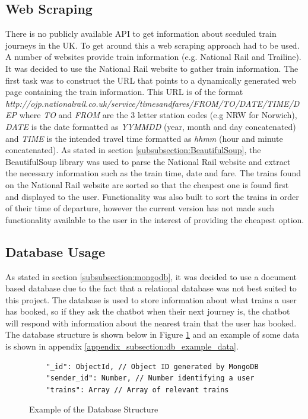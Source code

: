 \documentclass[12pt,a4paper]{article}
\begin{document}
    \subsection{Web Scraping}
    There is no publicly available API to get information about sceduled train journeys in the UK. To get around this a web scraping approach had to be used. A number of websites provide train information (e.g. National Rail and Trailine). It was decided to use the National Rail website to gather train information. The first task was to construct the URL that points to a dynamically generated web page containing the train information. This URL is of the format
    \emph{http://ojp.nationalrail.co.uk/service/timesandfares/FROM/TO/DATE/TIME/DEP} where \emph{TO} and \emph{FROM} are the 3 letter station codes (e.g NRW for Norwich), \emph{DATE} is the date formatted as \emph{YYMMDD} (year, month and day concatenated) and \emph{TIME} is the intended travel time formatted as \emph{hhmm} (hour and minute concatenated).
    As stated in section \ref{subsubsection:BeautifulSoup}, the BeautifulSoup library was used to parse the National Rail website and extract the necessary information such as the train time, date and fare. The trains found on the National Rail website are sorted so that the cheapest one is found first and displayed to the user. Functionality was also built to sort the trains in order of their time of departure, however the current version has not made such functionality available to the user in the interest of providing the cheapest option.
    
    \subsection{Database Usage}
    As stated in section \ref{subsubsection:mongodb}, it was decided to use a document based database due to the fact that a relational database was not best suited to this project. The database is used to store information about what trains a user has booked, so if they ask the chatbot when their next journey is, the chatbot will respond with information about the nearest train that the user has booked. The database structure is shown below in Figure \ref{fig:db_structure} and an example of some data is shown in appendix \ref{appendix_subsection:db_example_data}. \\
    
    \begin{figure}
    \begin{lstlisting}
    "_id": ObjectId, // Object ID generated by MongoDB
    "sender_id": Number, // Number identifying a user
    "trains": Array // Array of relevant trains
    \end{lstlisting}
    \caption{Example of the Database Structure}
    \label{fig:db_structure}
    \end{figure}
    
\end{document}
